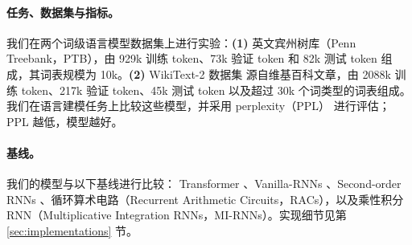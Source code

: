 \documentclass{article}
\theoremstyle{plain}
\theoremstyle{definition}
\theoremstyle{remark}
\begin{document}
\paragraph{任务、数据集与指标。} 我们在两个词级语言模型数据集上进行实验：\textbf{(1)} 英文宾州树库（Penn Treebank，PTB）\citep{marcinkiewicz1994building}，由 929k 训练 token、73k 验证 token 和 82k 测试 token 组成，其词表规模为 10k。\textbf{(2)} WikiText-2 数据集 \citep{merity2016pointer} 源自维基百科文章，由 2088k 训练 token、217k 验证 token、45k 测试 token 以及超过 30k 个词类型的词表组成。我们在语言建模任务上比较这些模型，并采用 perplexity（PPL）\citep{meister-cotterell-2021-language} 进行评估；PPL 越低，模型越好。


\paragraph{基线。} 我们的模型与以下基线进行比较：
  Transformer \citep{vaswani2017attention}、Vanilla-RNNs \citep{mikolov2012context}、Second-order RNNs \citep{hochreiter1997long}、循环算术电路（Recurrent Arithmetic Circuits，RACs）\citep{levine2018benefits}，以及乘性积分 RNN（Multiplicative Integration RNNs，MI-RNNs）\citep{wu_multiplicative_2016}。实现细节见第 \ref{sec:implementations} 节。






\end{document}

